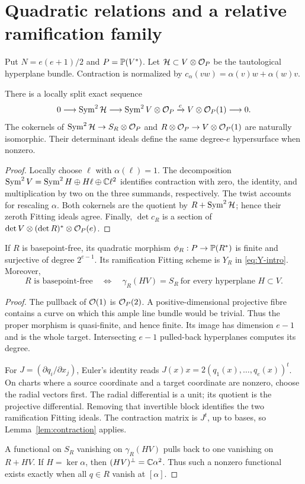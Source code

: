 \section{Quadratic relations and a relative ramification family}
\label{sec:relations}
Put $N=e(e+1)/2$ and $P=\mathbb P(V^*)$. Let $\mathcal H\subset
V\otimes\mathcal O_P$ be the tautological hyperplane bundle. Contraction is
normalized by $c_\alpha(vw)=\alpha(v)w+\alpha(w)v$.

\begin{lemma}\label{lem:contraction}
There is a locally split exact sequence
\[
 0\longrightarrow\operatorname{Sym}^2\mathcal H\longrightarrow\operatorname{Sym}^2V\otimes\mathcal O_P
 \xrightarrow{c}V\otimes\mathcal O_P(1)\longrightarrow0.
\]
The cokernels of $\operatorname{Sym}^2\mathcal H\to S_R\otimes\mathcal O_P$ and
$R\otimes\mathcal O_P\to V\otimes\mathcal O_P(1)$ are naturally isomorphic.
Their determinant ideals define the same degree-$e$ hypersurface
when nonzero.
\end{lemma}
\begin{proof}
Locally choose $\ell$ with $\alpha(\ell)=1$. The decomposition
$\operatorname{Sym}^2V=\operatorname{Sym}^2H\oplus H\ell\oplus\mathbb C\ell^2$ identifies contraction
with zero, the identity, and multiplication by two on the three
summands, respectively. The twist accounts for rescaling $\alpha$.
Both cokernels are the quotient by $R+\operatorname{Sym}^2\mathcal H$; hence their
zeroth Fitting ideals agree. Finally, $\det c_R$ is a section of
$\det V\otimes(\det R)^*\otimes\mathcal O_P(e)$.
\end{proof}

\begin{proposition}\label{prop:finite-map}
If $R$ is basepoint-free, its quadratic morphism
$\phi_R:P\to\mathbb P(R^*)$ is finite and surjective of degree
$2^{e-1}$. Its ramification Fitting scheme is $Y_R$ in
\eqref{eq:Y-intro}. Moreover,
\begin{equation}\label{eq:firstorder}
 R\text{ is basepoint-free}
 \quad\Longleftrightarrow\quad
 \gamma_R(HV)=S_R\ \text{for every hyperplane }H\subset V.
\end{equation}
\end{proposition}
\begin{proof}
The pullback of $\mathcal O(1)$ is $\mathcal O_P(2)$. A positive-dimensional
projective fibre contains a curve on which this ample line bundle
would be trivial. Thus the proper morphism is quasi-finite, and hence
finite. Its image has dimension $e-1$ and is the whole target.
Intersecting $e-1$ pulled-back hyperplanes computes its degree.

For $J=(\partial q_i/\partial x_j)$, Euler's identity reads
$J(x)x=2(q_1(x),\ldots,q_e(x))^t$. On charts where a source coordinate
and a target coordinate are nonzero, choose the radial vectors first.
The radial differential is a unit; its quotient is the projective
differential. Removing that invertible block identifies the two
ramification Fitting ideals. The contraction matrix is $J^t$, up to
bases, so Lemma~\ref{lem:contraction} applies.

A functional on $S_R$ vanishing on $\gamma_R(HV)$ pulls back to one
vanishing on $R+HV$. If $H=\ker\alpha$, then
$(HV)^\perp=\mathbb C\alpha^2$. Thus such a nonzero functional exists exactly
when all $q\in R$ vanish at $[\alpha]$.
\end{proof}

